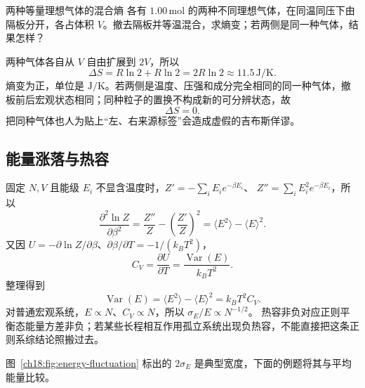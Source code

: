 \begin{origexamplebox}{两种等量理想气体的混合熵}
各有 $1.00\,\mathrm{mol}$ 的两种不同理想气体，在同温同压下由隔板分开，各占体积 $V$。撤去隔板并等温混合，求熵变；若两侧是同一种气体，结果怎样？

\StatQMixing
\end{origexamplebox}
\begin{xesolution}
两种气体各自从 $V$ 自由扩展到 $2V$，所以
\[
 \Delta S=R\ln2+R\ln2=\boxed{2R\ln2\approx11.5\,\mathrm{J/K}}.
\]
熵变为正，单位是 $\mathrm{J/K}$。若两侧是温度、压强和成分完全相同的同一种气体，撤板前后宏观状态相同；同种粒子的置换不构成新的可分辨状态，故
\[
 \boxed{\Delta S=0}.
\]
把同种气体也人为贴上“左、右来源标签”会造成虚假的吉布斯佯谬。

\StatAMixing
\end{xesolution}

\subsection{能量涨落与热容}

固定 $N,V$ 且能级 $E_i$ 不显含温度时，$Z'= -\sum_iE_ie^{-\beta E_i}$、
$Z''=\sum_iE_i^2e^{-\beta E_i}$，所以
\[\frac{\partial^2\ln Z}{\partial\beta^2}
=\frac{Z''}Z-\left(\frac{Z'}Z\right)^2=\langle E^2\rangle-\langle E\rangle^2.\]
又因 $U=-\partial\ln Z/\partial\beta$、$\partial\beta/\partial T=-1/(k_BT^2)$，
\[ C_V=\frac{\partial U}{\partial T}
=\frac{\operatorname{Var}(E)}{k_BT^2}.\]
整理得到
\begin{equation}
 \operatorname{Var}(E)=\langle E^2\rangle-\langle E\rangle^2
 =k_BT^2C_V.
\end{equation}
对普通宏观系统，$E\propto N$、$C_V\propto N$，所以 $\sigma_E/E\propto N^{-1/2}$。
热容非负对应正则平衡态能量方差非负；若某些长程相互作用孤立系统出现负热容，不能直接把这条正则系综结论照搬过去。

\begin{center}\begin{minipage}{\linewidth}\centering
{}
\label{ch18:fig:energy-fluctuation}
\end{minipage}\end{center}
图~\ref{ch18:fig:energy-fluctuation} 标出的 $2\sigma_E$ 是典型宽度，下面的例题将其与平均能量比较。

